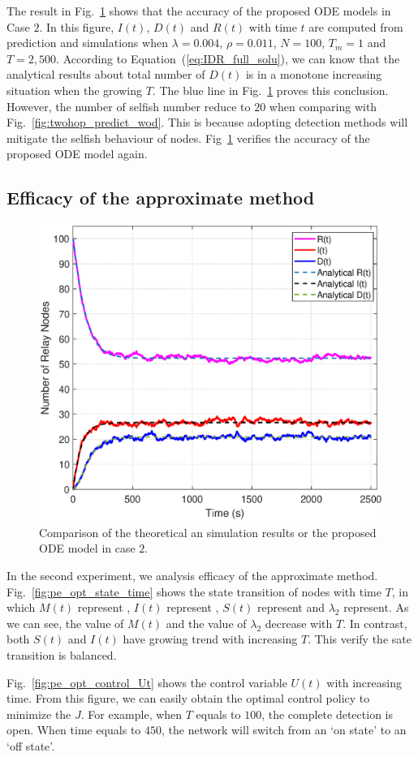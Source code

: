 The result in Fig.~\ref{fig:twohop_predict_full_d} shows that
the accuracy of the proposed ODE models in Case $2$.
In this figure,
$I(t)$, $D(t)$ and $R(t)$ with time $t$  are computed from prediction and simulations
when $\lambda = 0.004$, $\rho = 0.011$, $N=100$, $T_{m} = 1$ and $T=2,500$.
According to Equation~(\ref{eq:IDR_full_solu}),
we can know that the analytical results about total number of $D(t)$ is in a monotone increasing
situation when the growing $T$.
The blue line in Fig.~\ref{fig:twohop_predict_full_d} proves this conclusion.
However, 
the number of selfish number reduce to $20$ when comparing with Fig.~\ref{fig:twohop_predict_wod}.
This is because adopting detection methods will mitigate the selfish behaviour of nodes.
Fig~\ref{fig:twohop_predict_full_d} verifies the accuracy of the proposed ODE model again.

\subsection{Efficacy of the approximate method}
\begin{figure}
  \includegraphics[width=.45\textwidth]{fig/twohop_with_fully_detection.eps}
  \caption{Comparison of the theoretical an simulation results or the proposed ODE model in case $2$.}
  \label{fig:twohop_predict_full_d}
\end{figure}
In the second experiment,
we analysis efficacy of the approximate method.
Fig.~\ref{fig:pe_opt_state_time} shows the state transition of nodes with time $T$,
in which $M(t)$ represent ,
$I(t)$ represent ,
$S(t)$ represent and $\lambda_2$ represent.
As we can see,
the value of $M(t)$ and the value of $\lambda_2$ decrease 
with $T$. 
In contrast,
both $S(t)$ and $I(t)$ have growing trend with increasing $T$.
This verify the sate transition is balanced.

Fig.~\ref{fig:pe_opt_control_Ut} shows the control variable $U(t)$ with increasing time.
From this figure, 
we can easily obtain the optimal control policy to
minimize the $J$. 
For example, 
when $T$ equals to $100$, 
the complete detection is open.
When time equals to $450$,
the network will switch from an `on state' to an `off state'.
